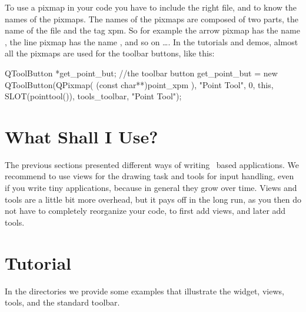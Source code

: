 











To use a pixmap in your code you have to include the right file, and
to know the names of the pixmaps. The names of the pixmaps are
composed of two parts, the name of the file and the tag xpm. So for
example the arrow pixmap has the name , the line
pixmap has the name , and so on \ldots.  In the
tutorials and demos, almost all the pixmaps are used for the toolbar
buttons, like this:

\ccExample
\begin{ccExampleCode}
    QToolButton *get_point_but; //the toolbar button
    get_point_but =  new QToolButton(QPixmap( (const char**)point_xpm ),
                                     "Point Tool", 
                                     0, 
                                     this, 
                                     SLOT(pointtool()), 
                                     tools_toolbar, 
                                     "Point Tool");
\end{ccExampleCode}



\section{What Shall I Use?}

The previous sections presented different ways of writing \qt\ based 
applications. We recommend to use views for the drawing task and tools
for input handling, even if you write tiny applications, because in general
they grow over time.   Views and tools are a little bit more overhead, but 
it pays off in the long run, as you then do not have to completely
reorganize your code, to first add views, and later add tools. 





\section{Tutorial}

In the directories  we provide some examples
that illustrate the widget, views, tools, and the standard toolbar.








